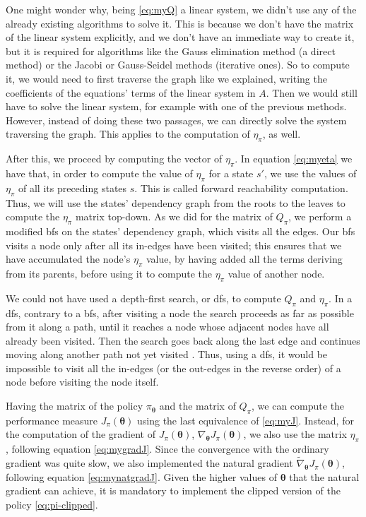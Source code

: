 One might wonder why, being \eqref{eq:myQ} a linear system, we didn't use any of the already existing algorithms to solve it. This is because we don't have the matrix of the linear system explicitly, and we don't have an immediate way to create it, but it is required for algorithms like the Gauss elimination method (a direct method) or the Jacobi or Gauss-Seidel methods (iterative ones). So to compute it, we would need to first traverse the graph like we explained, writing the coefficients of the equations' terms of the linear system in $A$. Then we would still have to solve the linear system, for example with one of the previous methods. However, instead of doing these two passages, we can directly solve the system traversing the graph. This applies to the computation of $\eta_\pi$, as well.

After this, we proceed by computing the vector of $\eta_\pi$. In equation \eqref{eq:myeta} we have that, in order to compute the value of $\eta_\pi$ for a state $s'$, we use the values of $\eta_\pi$ of all its preceding states $s$. This is called forward reachability computation. Thus, we will use the states' dependency graph from the roots to the leaves to compute the $\eta_\pi$ matrix top-down. As we did for the matrix of $Q_\pi$, we perform a modified \acrshort{bfs} on the states' dependency graph, which visits all the edges. Our \acrshort{bfs} visits a node only after all its in-edges have been visited; this ensures that we have accumulated the node's $\eta_\pi$ value, by having added all the terms deriving from its parents, before using it to compute the $\eta_\pi$ value of another node.

We could not have used a depth-first search, or \acrshort{dfs}, to compute $Q_\pi$ and $\eta_\pi$. In a \acrshort{dfs}, contrary to a \acrshort{bfs}, after visiting a node the search proceeds as far as possible from it along a path, until it reaches a node whose adjacent nodes have all already been visited. Then the search goes back along the last edge and continues moving along another path not yet visited \cite{Montresor2014}. Thus, using a \acrshort{dfs}, it would be impossible to visit all the in-edges (or the out-edges in the reverse order) of a node before visiting the node itself.

Having the matrix of the policy $\pi_{\boldsymbol \theta}$ and the matrix of $Q_\pi$, we can compute the performance measure $J_\pi (\boldsymbol \theta)$ using the last equivalence of \eqref{eq:myJ}. Instead, for the computation of the gradient of $J_\pi (\boldsymbol \theta)$, $\nabla_{\boldsymbol \theta} J_\pi (\boldsymbol \theta)$, we also use the matrix $\eta_\pi$, following equation \eqref{eq:mygradJ}. Since the convergence with the ordinary gradient was quite slow, we also implemented the natural gradient $\widetilde \nabla_{\boldsymbol \theta} J_\pi (\boldsymbol \theta)$, following equation \eqref{eq:mynatgradJ}. Given the higher values of $\boldsymbol \theta$ that the natural gradient can achieve, it is mandatory to implement the clipped version of the policy \eqref{eq:pi-clipped}.

